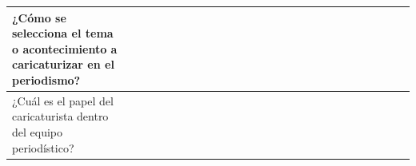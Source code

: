 \documentclass[12pt,a4paper]{article}
\begin{document}
\begin{landscape}
\begin{table}[ht!]
\begin{tabular}{llllllllllllllllllllllllll}
			¿Cómo se selecciona el tema o acontecimiento a caricaturizar en el periodismo?                         &                                          &    &    &    &    &    &    &    &    &     &     &     &     &     &     &     &     &     &     &     &           \\\hline
			¿Cuál es el papel del caricaturista dentro del equipo periodístico?                                    &                                          &    &    &    &    &    &    &    &    &     &     &     &     &     &     &     &     &     &     &     &           \\\hline
		\end{tabular}
	\end{table}
\end{landscape}
\end{document}

